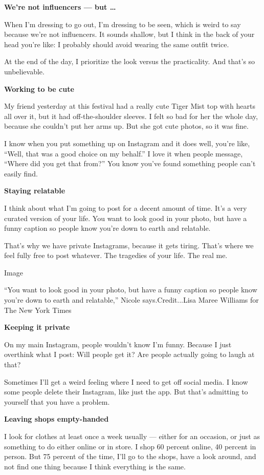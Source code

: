 \textbf{We're not influencers --- but \ldots{}}

When I'm dressing to go out, I'm dressing to be seen, which is weird to
say because we're not influencers. It sounds shallow, but I think in the
back of your head you're like: I probably should avoid wearing the same
outfit twice.

At the end of the day, I prioritize the look versus the practicality.
And that's so unbelievable.

\textbf{Working to be cute}

My friend yesterday at this festival had a really cute Tiger Mist top
with hearts all over it, but it had off-the-shoulder sleeves. I felt so
bad for her the whole day, because she couldn't put her arms up. But she
got cute photos, so it was fine.

I know when you put something up on Instagram and it does well, you're
like, ``Well, that was a good choice on my behalf.'' I love it when
people message, ``Where did you get that from?'' You know you've found
something people can't easily find.

\textbf{Staying relatable}

I think about what I'm going to post for a decent amount of time. It's a
very curated version of your life. You want to look good in your photo,
but have a funny caption so people know you're down to earth and
relatable.

That's why we have private Instagrams, because it gets tiring. That's
where we feel fully free to post whatever. The tragedies of your life.
The real me.

Image

``You want to look good in your photo, but have a funny caption so
people know you're down to earth and relatable,'' Nicole
says.Credit...Lisa Maree Williams for The New York Times

\textbf{Keeping it private}

On my main Instagram, people wouldn't know I'm funny. Because I just
overthink what I post: Will people get it? Are people actually going to
laugh at that?

Sometimes I'll get a weird feeling where I need to get off social media.
I know some people delete their Instagram, like just the app. But that's
admitting to yourself that you have a problem.

\textbf{Leaving shops empty-handed}

I look for clothes at least once a week usually --- either for an
occasion, or just as something to do either online or in store. I shop
60 percent online, 40 percent in person. But 75 percent of the time,
I'll go to the shops, have a look around, and not find one thing because
I think everything is the same.

